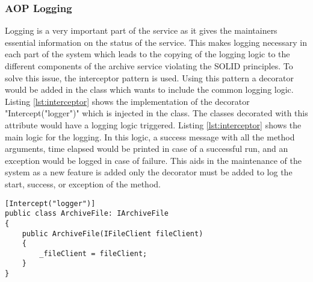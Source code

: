 \subsubsection{AOP Logging}
Logging is a very important part of the service as it gives the maintainers essential information on the status of the service. This makes logging necessary
in each part of the system which leads to the copying of the logging logic to the different components of the archive service violating the SOLID \cite{Hotop2015} principles. 
To solve this issue, the interceptor pattern is used. Using this pattern a decorator would be added in the class which wants to include the common
logging logic. Listing \ref{lst:interceptor} shows the implementation of the decorator "Intercept("logger")" which is injected in the class. The 
classes decorated with this attribute would have a logging logic triggered. Listing \ref{lst:interceptor} shows the main logic for the logging. In this logic, a success message
with all the method arguments, time elapsed would be printed in case of a successful run, and an exception would be logged in case of failure. This aids in the maintenance
of the system as a new feature is added only the decorator must be added to log the start, success, or exception of the method.

\begin{lstlisting}[language={[Sharp]C}, caption={Interceptor decorator example}, captionpos=b,label={lst:interceptor}]
[Intercept("logger")]
public class ArchiveFile: IArchiveFile
{
    public ArchiveFile(IFileClient fileClient)
    {
        _fileClient = fileClient;
    }
}
\end{lstlisting}            


